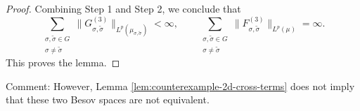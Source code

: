 \documentclass[12pt]{amsart}
\begin{document}
\begin{proof}
Combining Step 1 and Step 2, we conclude that
\[
\sum_{\substack{\sigma,\tilde{\sigma}\in G\\ \sigma\neq \tilde{\sigma}}}
\|G_{\sigma,\tilde{\sigma}}^{(3)}\|_{L^p(\mu_{\sigma,\tilde{\sigma}})}
<\infty,
\qquad
\sum_{\substack{\sigma,\tilde{\sigma}\in G\\ \sigma\neq \tilde{\sigma}}}
\|F_{\sigma,\tilde{\sigma}}^{(3)}\|_{L^p(\mu)}
=\infty.
\]
This proves the lemma.
\end{proof}

{\color{red}Comment: However, Lemma \ref{lem:counterexample-2d-cross-terms} does not imply that these two Besov spaces are not equivalent.}






\end{document}
